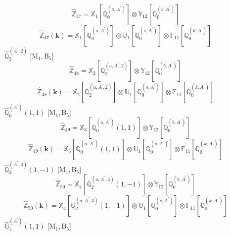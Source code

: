 \documentclass[fleqn,10pt,landscape]{article}
\begin{document}
\begin{itemize}
\begin{dmath*}
\hat{\mathbb{Z}}_{47}=\mathbb{X}_{1}[\mathbb{Q}_{0}^{(a,A^{\prime})}] \otimes\mathbb{Y}_{12}[\mathbb{Q}_{0}^{(b,A^{\prime})}]
\end{dmath*}
\begin{dmath*}
\hat{\mathbb{Z}}_{47}(\bm{k})=\mathbb{X}_{1}[\mathbb{Q}_{0}^{(a,A^{\prime})}] \otimes\mathbb{U}_{1}[\mathbb{Q}_{0}^{(s,A^{\prime})}] \otimes\mathbb{F}_{11}[\mathbb{Q}_{0}^{(k,A^{\prime})}]
\end{dmath*}
\vspace{4mm}
\noindent {} $\,\,\,\hat{\mathbb{Q}}_{2}^{(A^{\prime},2)}$ [M$_{1}$,\,B$_{5}$]
\begin{dmath*}
\hat{\mathbb{Z}}_{48}=\mathbb{X}_{2}[\mathbb{Q}_{2}^{(a,A^{\prime},2)}] \otimes\mathbb{Y}_{12}[\mathbb{Q}_{0}^{(b,A^{\prime})}]
\end{dmath*}
\begin{dmath*}
\hat{\mathbb{Z}}_{48}(\bm{k})=\mathbb{X}_{2}[\mathbb{Q}_{2}^{(a,A^{\prime},2)}] \otimes\mathbb{U}_{1}[\mathbb{Q}_{0}^{(s,A^{\prime})}] \otimes\mathbb{F}_{11}[\mathbb{Q}_{0}^{(k,A^{\prime})}]
\end{dmath*}
\vspace{4mm}
\noindent {} $\,\,\,\hat{\mathbb{Q}}_{0}^{(A^{\prime})}(1,1)$ [M$_{1}$,\,B$_{5}$]
\begin{dmath*}
\hat{\mathbb{Z}}_{49}=\mathbb{X}_{3}[\mathbb{Q}_{0}^{(a,A^{\prime})}(1,1)] \otimes\mathbb{Y}_{12}[\mathbb{Q}_{0}^{(b,A^{\prime})}]
\end{dmath*}
\begin{dmath*}
\hat{\mathbb{Z}}_{49}(\bm{k})=\mathbb{X}_{3}[\mathbb{Q}_{0}^{(a,A^{\prime})}(1,1)] \otimes\mathbb{U}_{1}[\mathbb{Q}_{0}^{(s,A^{\prime})}] \otimes\mathbb{F}_{11}[\mathbb{Q}_{0}^{(k,A^{\prime})}]
\end{dmath*}
\vspace{4mm}
\noindent {} $\,\,\,\hat{\mathbb{Q}}_{2}^{(A^{\prime},3)}(1,-1)$ [M$_{1}$,\,B$_{5}$]
\begin{dmath*}
\hat{\mathbb{Z}}_{50}=\mathbb{X}_{4}[\mathbb{Q}_{2}^{(a,A^{\prime},3)}(1,-1)] \otimes\mathbb{Y}_{12}[\mathbb{Q}_{0}^{(b,A^{\prime})}]
\end{dmath*}
\begin{dmath*}
\hat{\mathbb{Z}}_{50}(\bm{k})=\mathbb{X}_{4}[\mathbb{Q}_{2}^{(a,A^{\prime},3)}(1,-1)] \otimes\mathbb{U}_{1}[\mathbb{Q}_{0}^{(s,A^{\prime})}] \otimes\mathbb{F}_{11}[\mathbb{Q}_{0}^{(k,A^{\prime})}]
\end{dmath*}
\vspace{4mm}
\noindent {} $\,\,\,\hat{\mathbb{G}}_{1}^{(A^{\prime})}(1,1)$ [M$_{1}$,\,B$_{5}$]

\end{itemize}
\end{document}
